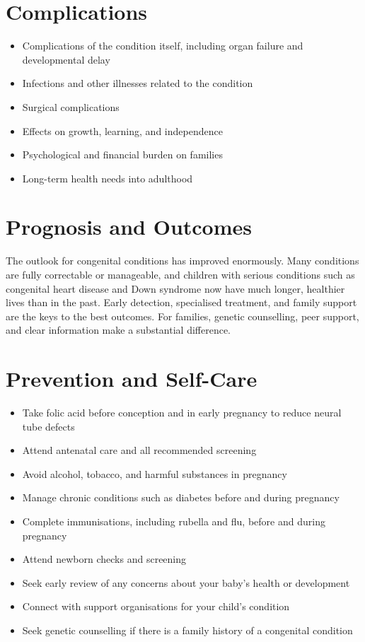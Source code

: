 \section*{Complications}
\begin{itemize}
    \item Complications of the condition itself, including organ failure and developmental delay
    \item Infections and other illnesses related to the condition
    \item Surgical complications
    \item Effects on growth, learning, and independence
    \item Psychological and financial burden on families
    \item Long-term health needs into adulthood
\end{itemize}

\section*{Prognosis and Outcomes}
The outlook for congenital conditions has improved enormously. Many conditions are fully correctable or manageable, and children with serious conditions such as congenital heart disease and Down syndrome now have much longer, healthier lives than in the past. Early detection, specialised treatment, and family support are the keys to the best outcomes. For families, genetic counselling, peer support, and clear information make a substantial difference.

\section*{Prevention and Self-Care}
\begin{itemize}
    \item Take folic acid before conception and in early pregnancy to reduce neural tube defects
    \item Attend antenatal care and all recommended screening
    \item Avoid alcohol, tobacco, and harmful substances in pregnancy
    \item Manage chronic conditions such as diabetes before and during pregnancy
    \item Complete immunisations, including rubella and flu, before and during pregnancy
    \item Attend newborn checks and screening
    \item Seek early review of any concerns about your baby's health or development
    \item Connect with support organisations for your child's condition
    \item Seek genetic counselling if there is a family history of a congenital condition
\end{itemize}

